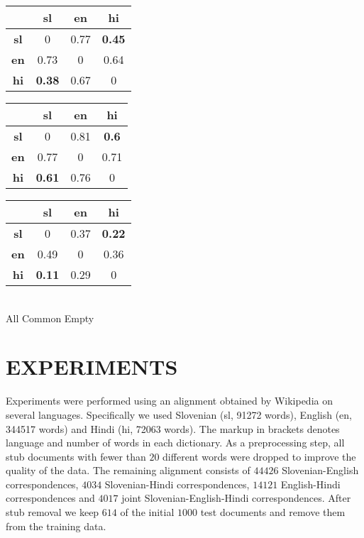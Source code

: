 \documentclass[twocolumn, draft]{article}
\begin{document}
\begin{table*}[htbp]
\begin{center}
\caption{CL-LSI MAPR retrieval in common semantic space}
\label{lsi_common}
\begin{tabular}{|c|c|c|c|}\hline
&{\bf sl}& {\bf en}   & {\bf hi}\\\hline
{\bf sl} &0 & 0.77 & {\bf 0.45}\\\hline
{\bf en} &0.73 & 0 & 0.64\\\hline
{\bf hi} & {\bf 0.38} & 0.67 & 0\\\hline
\end{tabular}
\hspace{0.5cm}
\begin{tabular}{|c|c|c|c|}\hline &{\bf sl}& {\bf en}   & {\bf hi}\\\hline{\bf sl} & 0 & 0.81 & {\bf 0.6}\\\hline {\bf en} & 0.77 & 0 & 0.71\\\hline {\bf hi} &{\bf 0.61} & 0.76 & 0 \\\hline\end{tabular}
\hspace{0.5cm}
\begin{tabular}{|c|c|c|c|}\hline&{\bf sl}& {\bf en}   & {\bf hi}\\\hline {\bf sl} & 0 & 0.37 & {\bf 0.22}\\\hline {\bf en} & 0.49 & 0 & 0.36\\\hline {\bf hi} & {\bf 0.11} & 0.29 & 0 \\\hline\end{tabular}\\
\vspace{0.1cm}
\hspace{1cm}All \hspace{3.7cm} Common\hspace{3.7cm} Empty \hspace{0.7cm} \ \\
\end{center}
\end{table*}
\vspace{-0.2cm}
\section{EXPERIMENTS}
\vspace{-0.2cm}

Experiments were performed using an alignment obtained by
Wikipedia on several languages. Specifically we used Slovenian
(sl, 91272 words), English (en, 344517 words) and Hindi (hi,
72063 words). The markup in brackets denotes language and number
of words in each dictionary.  As a preprocessing step, all stub
documents with fewer than $20$ different words were dropped to
improve the quality of the data.  The remaining alignment
consists of $44426$ Slovenian-English correspondences, $4034$
Slovenian-Hindi correspondences, $14121$ English-Hindi
correspondences and $4017$ joint Slovenian-English-Hindi
correspondences.  After stub removal we keep $614$ of the initial
$1000$ test documents and remove them from the training data.
\end{document}
